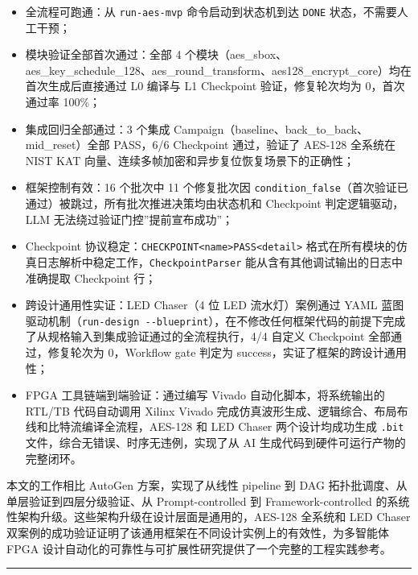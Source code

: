 \begin{itemize}
\tightlist
\item
  全流程可跑通：从 \texttt{run-aes-mvp} 命令启动到状态机到达
  \texttt{DONE} 状态，不需要人工干预；
\item
  模块验证全部首次通过：全部 4
  个模块（aes\_sbox、aes\_key\_schedule\_128、aes\_round\_transform、aes128\_encrypt\_core）均在首次生成后直接通过
  L0 编译与 L1 Checkpoint 验证，修复轮次均为 0，首次通过率 100\%；
\item
  集成回归全部通过：3 个集成
  Campaign（baseline、back\_to\_back、mid\_reset）全部 PASS，6/6
  Checkpoint 通过，验证了 AES-128 全系统在 NIST KAT
  向量、连续多帧加密和异步复位恢复场景下的正确性；
\item
  框架控制有效：16 个批次中 11 个修复批次因
  \texttt{condition\_false}（首次验证已通过）被跳过，所有批次推进决策均由状态机和
  Checkpoint 判定逻辑驱动，LLM 无法绕过验证门控''提前宣布成功''；
\item
  Checkpoint
  协议稳定：\texttt{CHECKPOINT\textbar{}\textless{}name\textgreater{}\textbar{}PASS\textbar{}\textless{}detail\textgreater{}}
  格式在所有模块的仿真日志解析中稳定工作，\texttt{CheckpointParser}
  能从含有其他调试输出的日志中准确提取 Checkpoint 行；
\item
  跨设计通用性实证：LED Chaser（4 位 LED 流水灯）案例通过 YAML
  蓝图驱动机制（\texttt{run-design\ -\/-blueprint}），在不修改任何框架代码的前提下完成了从规格输入到集成验证通过的全流程执行，4/4
  自定义 Checkpoint 全部通过，修复轮次为 0，Workflow gate 判定为
  success，实证了框架的跨设计通用性；
\item
  FPGA 工具链端到端验证：通过编写 Vivado
  自动化脚本，将系统输出的 RTL/TB 代码自动调用 Xilinx Vivado
  完成仿真波形生成、逻辑综合、布局布线和比特流编译全流程，AES-128 和 LED
  Chaser 两个设计均成功生成 \texttt{.bit} 文件，综合无错误、时序无违例，实现了从
  AI 生成代码到硬件可运行产物的完整闭环。
\end{itemize}

本文的工作相比 AutoGen 方案，实现了从线性 pipeline 到 DAG
拓扑批调度、从单层验证到四层分级验证、从 Prompt-controlled 到
Framework-controlled
的系统性架构升级。这些架构升级在设计层面是通用的，AES-128 全系统和 LED
Chaser
双案例的成功验证证明了该通用框架在不同设计实例上的有效性，为多智能体
FPGA 设计自动化的可靠性与可扩展性研究提供了一个完整的工程实践参考。

\begin{center}\rule{0.5\linewidth}{0.5pt}\end{center}

